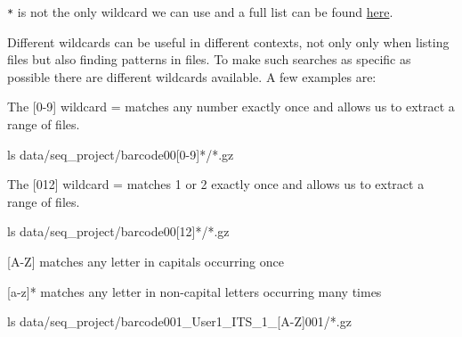 \documentclass[
  letterpaper,
  DIV=11,
  numbers=noendperiod]{scrreprt}
\newenvironment{Shaded}{}{}
\newcommand{\FunctionTok}[1]{\textcolor[rgb]{0.44,0.26,0.76}{#1}}
\newcommand{\NormalTok}[1]{\textcolor[rgb]{0.14,0.16,0.18}{#1}}
\newcommand{\PreprocessorTok}[1]{\textcolor[rgb]{0.84,0.23,0.29}{#1}}
\newcommand{\SpecialStringTok}[1]{\textcolor[rgb]{0.01,0.18,0.38}{#1}}
\begin{document}
\begin{tcolorbox}[enhanced jigsaw, breakable, left=2mm, title=\textcolor{quarto-callout-tip-color}{\faLightbulb}\hspace{0.5em}{Tip: More wildcards}, opacityback=0, opacitybacktitle=0.6, rightrule=.15mm, bottomrule=.15mm, colback=white, colframe=quarto-callout-tip-color-frame, coltitle=black, bottomtitle=1mm, arc=.35mm, toprule=.15mm, colbacktitle=quarto-callout-tip-color!10!white, toptitle=1mm, titlerule=0mm, leftrule=.75mm]

\texttt{*} is not the only wildcard we can use and a full list can be
found
\href{https://tldp.org/LDP/GNU-Linux-Tools-Summary/html/x11655.htm}{here}.

Different wildcards can be useful in different contexts, not only only
when listing files but also finding patterns in files. To make such
searches as specific as possible there are different wildcards
available. A few examples are:

The {[}0-9{]} wildcard = matches any number exactly once and allows us
to extract a range of files.

\begin{Shaded}
\begin{Highlighting}[]
\FunctionTok{ls}\NormalTok{ data/seq\_project/barcode00}\PreprocessorTok{[}\SpecialStringTok{0}\PreprocessorTok{{-}}\SpecialStringTok{9}\PreprocessorTok{]*}\NormalTok{/}\PreprocessorTok{*}\NormalTok{.gz}
\end{Highlighting}
\end{Shaded}

The {[}012{]} wildcard = matches 1 or 2 exactly once and allows us to
extract a range of files.

\begin{Shaded}
\begin{Highlighting}[]
\FunctionTok{ls}\NormalTok{ data/seq\_project/barcode00}\PreprocessorTok{[}\SpecialStringTok{12}\PreprocessorTok{]*}\NormalTok{/}\PreprocessorTok{*}\NormalTok{.gz}
\end{Highlighting}
\end{Shaded}

{[}A-Z{]} matches any letter in capitals occurring once

{[}a-z{]}* matches any letter in non-capital letters occurring many
times

\begin{Shaded}
\begin{Highlighting}[]
\FunctionTok{ls}\NormalTok{ data/seq\_project/barcode001\_User1\_ITS\_1\_}\PreprocessorTok{[}\SpecialStringTok{A}\PreprocessorTok{{-}}\SpecialStringTok{Z}\PreprocessorTok{]}\NormalTok{001/}\PreprocessorTok{*}\NormalTok{.gz}
\end{Highlighting}
\end{Shaded}

\end{tcolorbox}
\end{document}
